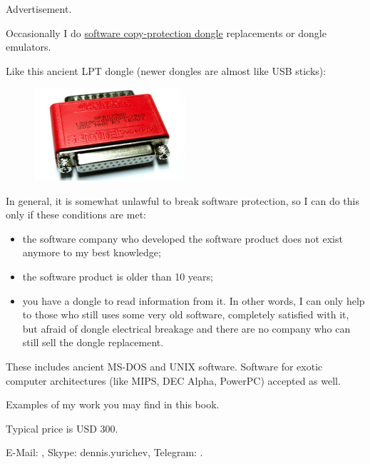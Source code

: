 
Advertisement.

Occasionally I do \href{https://en.wikipedia.org/wiki/Software_protection_dongle}{software copy-protection dongle} replacements or dongle emulators.

Like this ancient LPT dongle (newer dongles are almost like USB sticks):

\begin{figure}[H]
\centering
\includegraphics[width=0.5\textwidth]{superpro.jpg}
\end{figure}

In general, it is somewhat unlawful to break software protection, so I can do this only if these conditions are met:

	\begin{itemize}
	\item the software company who developed the software product does not exist anymore to my best knowledge;
	\item the software product is older than 10 years;
	\item you have a dongle to read information from it. In other words, I can only help to those who still uses some very old software, completely satisfied with it, but afraid of dongle electrical breakage and there are no company who can still sell the dongle replacement.
	\end{itemize}

These includes ancient MS-DOS and UNIX software. Software for exotic computer architectures (like MIPS, DEC Alpha, PowerPC) accepted as well.

Examples of my work you may find in this book.

Typical price is USD 300.

E-Mail: \EMAIL{}, Skype: dennis.yurichev, Telegram: .

